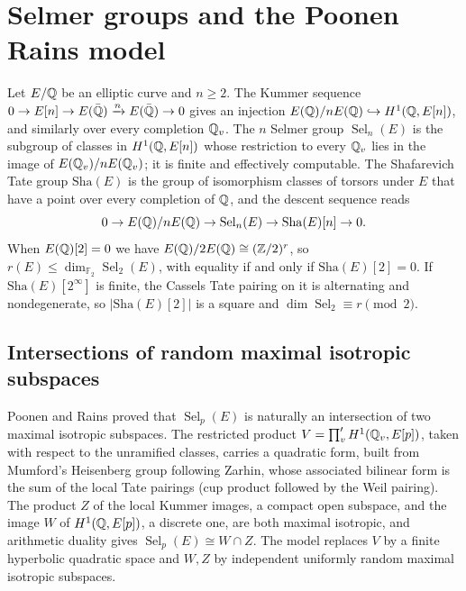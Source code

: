 \section{Selmer groups and the Poonen Rains model}\label{sec:06cselmer}

Let $E/\mathbb{Q}$ be an elliptic curve and $n\ge2$. The Kummer sequence $0\to E[n]\to E(\bar{\mathbb{Q}})\xrightarrow{n}E(\bar{\mathbb{Q}})\to0$ gives an injection $E(\mathbb{Q})/nE(\mathbb{Q})\hookrightarrow H^1(\mathbb{Q},E[n])$, and similarly over every completion $\mathbb{Q}_v$. The $n$ Selmer group $\operatorname{Sel}_n(E)$ is the subgroup of classes in $H^1(\mathbb{Q},E[n])$ whose restriction to every $\mathbb{Q}_v$ lies in the image of $E(\mathbb{Q}_v)/nE(\mathbb{Q}_v)$; it is finite and effectively computable. The Shafarevich Tate group $\mathrm{Sha}(E)$ is the group of isomorphism classes of torsors under $E$ that have a point over every completion of $\mathbb{Q}$, and the descent sequence reads
\begin{equation}\label{eq:06cdescent}
0\to E(\mathbb{Q})/nE(\mathbb{Q})\to\operatorname{Sel}_n(E)\to\mathrm{Sha}(E)[n]\to0 .
\end{equation}
When $E(\mathbb{Q})[2] = 0$ we have $E(\mathbb{Q})/2E(\mathbb{Q})\cong(\mathbb{Z}/2)^{r}$, so $r(E)\le\dim_{\mathbb{F}_2}\operatorname{Sel}_2(E)$, with equality if and only if $\mathrm{Sha}(E)[2] = 0$. If $\mathrm{Sha}(E)[2^\infty]$ is finite, the Cassels Tate pairing on it is alternating and nondegenerate, so $|\mathrm{Sha}(E)[2]|$ is a square and $\dim\operatorname{Sel}_2\equiv r\pmod 2$.

\subsection{Intersections of random maximal isotropic subspaces}

Poonen and Rains \cite{poonenrains2012} proved that $\operatorname{Sel}_p(E)$ is naturally an intersection of two maximal isotropic subspaces. The restricted product $V = \prod'_vH^1(\mathbb{Q}_v,E[p])$, taken with respect to the unramified classes, carries a quadratic form, built from Mumford's Heisenberg group following Zarhin, whose associated bilinear form is the sum of the local Tate pairings (cup product followed by the Weil pairing). The product $Z$ of the local Kummer images, a compact open subspace, and the image $W$ of $H^1(\mathbb{Q},E[p])$, a discrete one, are both maximal isotropic, and arithmetic duality gives $\operatorname{Sel}_p(E)\cong W\cap Z$. The model replaces $V$ by a finite hyperbolic quadratic space and $W,Z$ by independent uniformly random maximal isotropic subspaces.


